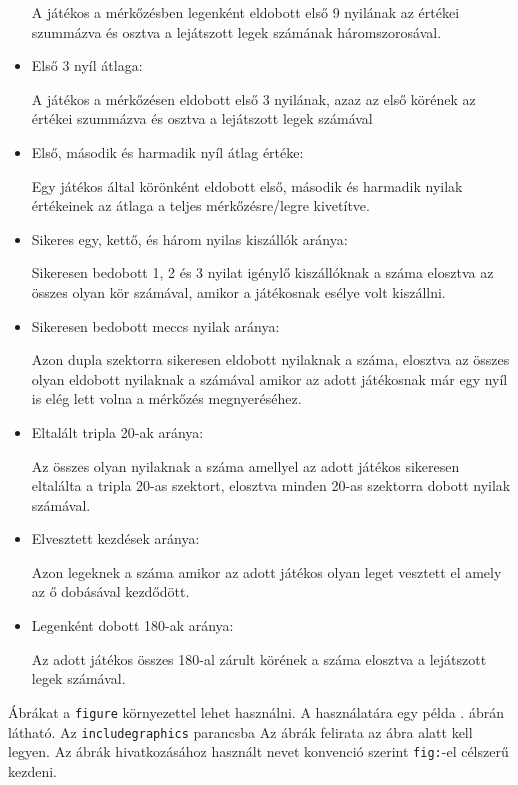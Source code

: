 \begin{itemize}
A játékos a mérkőzésben legenként eldobott első 9 nyilának az értékei szummázva és osztva a lejátszott legek számának háromszorosával.
\item Első 3 nyíl átlaga:

A játékos a mérkőzésen eldobott első 3 nyilának, azaz az első körének az értékei szummázva és osztva a lejátszott legek számával
\item Első, második és harmadik nyíl átlag értéke:

Egy játékos által körönként eldobott első, második és harmadik nyilak értékeinek az átlaga a teljes mérkőzésre/legre kivetítve.
\item Sikeres egy, kettő, és három nyilas kiszállók aránya:

Sikeresen bedobott 1, 2 és 3 nyilat igénylő kiszállóknak a száma elosztva az összes olyan kör számával, amikor a játékosnak esélye volt kiszállni.
\item Sikeresen bedobott meccs nyilak aránya:

Azon dupla szektorra sikeresen eldobott nyilaknak a száma, elosztva az összes olyan eldobott nyilaknak a számával amikor az adott játékosnak már egy nyíl is elég lett volna a mérkőzés megnyeréséhez.
\item Eltalált tripla 20-ak aránya:

Az összes olyan nyilaknak a száma amellyel az adott játékos sikeresen eltalálta a tripla 20-as szektort, elosztva minden 20-as szektorra dobott nyilak számával.
\item Elvesztett kezdések aránya:

Azon legeknek a száma amikor az adott játékos olyan leget vesztett el amely az ő dobásával kezdődött.
\item Legenként dobott 180-ak aránya:

Az adott játékos összes 180-al zárult körének a száma elosztva a lejátszott legek számával.

\end{itemize}


Ábrákat a \texttt{figure} környezettel lehet használni.
A használatára egy példa . ábrán látható.
Az \texttt{includegraphics} parancsba 
Az ábrák felirata az ábra alatt kell legyen.
Az ábrák hivatkozásához használt nevet konvenció szerint \texttt{fig:}-el célszerű kezdeni.

